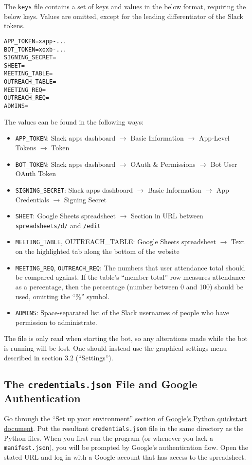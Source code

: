 \documentclass[english]{article}
\begin{document}
The \texttt{keys} file contains a set of keys and values in the below
format, requiring the below keys. Values are omitted, except for the
leading differentiator of the Slack tokens. 
\begin{verbatim}
APP_TOKEN=xapp-...
BOT_TOKEN=xoxb-...
SIGNING_SECRET=
SHEET=
MEETING_TABLE=
OUTREACH_TABLE=
MEETING_REQ=
OUTREACH_REQ=
ADMINS=
\end{verbatim}
The values can be found in the following ways: 
\begin{itemize}
\item \texttt{APP\_TOKEN}: Slack apps dashboard $\to$ Basic Information
$\to$ App-Level Tokens $\to$ Token 
\item \texttt{BOT\_TOKEN}: Slack apps dashboard $\to$ OAuth \& Permissions
$\to$ Bot User OAuth Token 
\item \texttt{SIGNING\_SECRET}: Slack apps dashboard $\to$ Basic Information
$\to$ App Credentials $\to$ Signing Secret 
\item \texttt{SHEET}: Google Sheets spreadsheet $\to$ Section in URL between
\texttt{spreadsheets/d/} and \texttt{/edit} 
\item \texttt{MEETING\_TABLE}, OUTREACH\_TABLE: Google Sheets spreadsheet
$\to$ Text on the highlighted tab along the bottom of the website 
\item \texttt{MEETING\_REQ}, \texttt{OUTREACH\_REQ}: The numbers that user
attendance total should be compared against. If the table's ``member
total'' row measures attendance as a percentage, then the percentage
(number between 0 and 100) should be used, omitting the ``\%'' symbol.
\item \texttt{ADMINS}: Space-separated list of the Slack usernames of people
who have permission to administrate.
\end{itemize}
The file is only read when starting the bot, so any alterations made
while the bot is running will be lost. One should instead use the
graphical settings menu described in section 3.2 (``Settings'').

\subsection{The \texttt{credentials.json} File and Google Authentication}

Go through the ``Set up your environment'' section of \href{https://developers.google.com/sheets/api/quickstart/python\#set-up-environment}{Google's Python quickstart document}.
Put the resultant \texttt{credentials.json} file in the same directory
as the Python files. When you first run the program (or whenever you
lack a \texttt{manifest.json}), you will be prompted by Google's authentication
flow. Open the stated URL and log in with a Google account that has
access to the spreadsheet.
\end{document}
